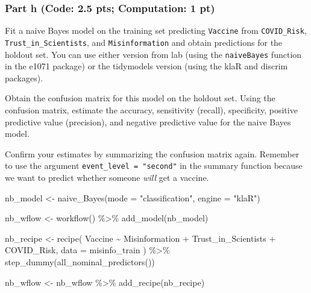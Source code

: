 \documentclass[
]{article}
\newenvironment{Shaded}{\begin{snugshade}}{\end{snugshade}}
\newcommand{\AttributeTok}[1]{\textcolor[rgb]{0.77,0.63,0.00}{#1}}
\newcommand{\FunctionTok}[1]{\textcolor[rgb]{0.00,0.00,0.00}{#1}}
\newcommand{\NormalTok}[1]{#1}
\newcommand{\OtherTok}[1]{\textcolor[rgb]{0.56,0.35,0.01}{#1}}
\newcommand{\SpecialCharTok}[1]{\textcolor[rgb]{0.00,0.00,0.00}{#1}}
\newcommand{\StringTok}[1]{\textcolor[rgb]{0.31,0.60,0.02}{#1}}
\begin{document}
\hypertarget{part-h-code-2.5-pts-computation-1-pt}{%
\subsubsection{Part h (Code: 2.5 pts; Computation: 1
pt)}\label{part-h-code-2.5-pts-computation-1-pt}}

Fit a naive Bayes model on the training set predicting \texttt{Vaccine}
from \texttt{COVID\_Risk}, \texttt{Trust\_in\_Scientists}, and
\texttt{Misinformation} and obtain predictions for the holdout set. You
can use either version from lab (using the \texttt{naiveBayes} function
in the e1071 package) or the tidymodels version (using the klaR and
discrim packages).

Obtain the confusion matrix for this model on the holdout set. Using the
confusion matrix, estimate the accuracy, sensitivity (recall),
specificity, positive predictive value (precision), and negative
predictive value for the naive Bayes model.

Confirm your estimates by summarizing the confusion matrix again.
Remember to use the argument \texttt{event\_level\ =\ "second"} in the
summary function because we want to predict whether someone \emph{will}
get a vaccine.

\begin{Shaded}
\begin{Highlighting}[]
\NormalTok{nb\_model }\OtherTok{\textless{}{-}} \FunctionTok{naive\_Bayes}\NormalTok{(}\AttributeTok{mode =} \StringTok{"classification"}\NormalTok{, }\AttributeTok{engine =} \StringTok{"klaR"}\NormalTok{)}

\NormalTok{nb\_wflow }\OtherTok{\textless{}{-}} \FunctionTok{workflow}\NormalTok{() }\SpecialCharTok{\%\textgreater{}\%}
  \FunctionTok{add\_model}\NormalTok{(nb\_model)}
\end{Highlighting}
\end{Shaded}

\begin{Shaded}
\begin{Highlighting}[]
\NormalTok{nb\_recipe }\OtherTok{\textless{}{-}} \FunctionTok{recipe}\NormalTok{(}
\NormalTok{  Vaccine }\SpecialCharTok{\textasciitilde{}}\NormalTok{ Misinformation }\SpecialCharTok{+}\NormalTok{ Trust\_in\_Scientists }\SpecialCharTok{+}\NormalTok{ COVID\_Risk, }
  \AttributeTok{data =}\NormalTok{ misinfo\_train}
\NormalTok{) }\SpecialCharTok{\%\textgreater{}\%} \FunctionTok{step\_dummy}\NormalTok{(}\FunctionTok{all\_nominal\_predictors}\NormalTok{())}

\NormalTok{nb\_wflow }\OtherTok{\textless{}{-}}\NormalTok{ nb\_wflow }\SpecialCharTok{\%\textgreater{}\%}
  \FunctionTok{add\_recipe}\NormalTok{(nb\_recipe)}
\end{Highlighting}
\end{Shaded}
\end{document}
